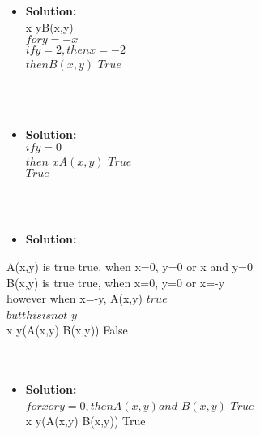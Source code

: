 \documentclass[11pt]{article}
\begin{document}
\begin{itemize}
\Large b. \exists x \forall yA(x,y)\\
\\
\item  \textbf{Solution:}\\
\Large \exists x \exists yB(x,y)\\
\Large $for y=-x$\\
\Large $if y = 2, then x = -2$\\
\Large $then B(x,y)$ \equiv$ True$

\end{itemize}
\\
\\
\begin{itemize}
\Large c. \forall x \exists yA(x,y)\\
\\
\item  \hspace{.2cm} \textbf{Solution:}\\
\Large $if  y = 0$\\
\Large $then $ \forall $xA(x,y)$ \equiv $True$\\
\Large \therefore $True$\\
\end{itemize}
\\
\\

\begin{itemize}
\Large d. \exists x \forall y(A(x,y) \land B(x,y))\\
\\
\item  \textbf{Solution:}\\
\end{itemize}
\Large A(x,y) is true true, when x=0, y=0 or x and y=0\\
\Large B(x,y) is true true, when x=0, y=0 or x=-y\\
\Large however when x=-y, A(x,y) \neq $true$ \\
\Large $but this is not $ \forall $y$\\
\Large \therefore \exists x \forall y(A(x,y) \land B(x,y)) \equiv False\\
\\
\\


\begin{itemize}
\Large e. \exists x \forall y(A(x,y) \land \neg B(x,y))\\
\\
\item  \textbf{Solution:}\\
\large $for x or y = 0, then A(x,y) and $ \neg  $B(x,y)$ \equiv $True$\\
\large \therefore \exists x \forall y(A(x,y) \land \neg B(x,y)) \equiv True \\



\end{itemize}

\\
\\
\end{document}
